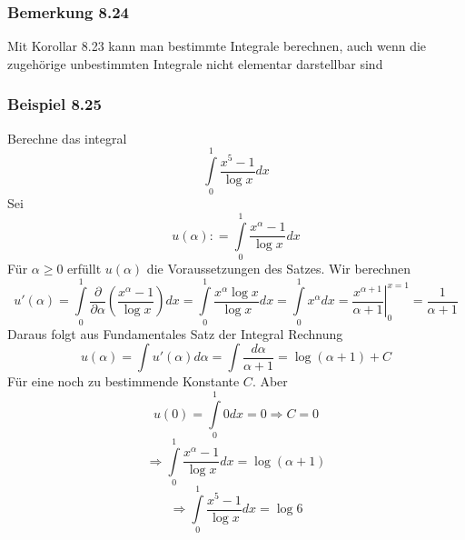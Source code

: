 \subsubsection*{Bemerkung 8.24}
Mit Korollar 8.23 kann man bestimmte Integrale berechnen, auch wenn die zugehörige unbestimmten Integrale nicht elementar darstellbar sind
\subsubsection*{Beispiel 8.25}
Berechne das integral \[\int\limits_0^1 {\frac{{{x^5} - 1}}{{\log x}}} dx\] Sei \[u\left( \alpha  \right): = \int\limits_0^1 {\frac{{{x^\alpha } - 1}}{{\log x}}dx} \] Für $\alpha \geq 0$ erfüllt $u\left(\alpha\right)$ die Voraussetzungen des Satzes. Wir berechnen \[u'\left( \alpha  \right) = \int\limits_0^1 {\frac{\partial }{{\partial \alpha }}\left( {\frac{{{x^\alpha } - 1}}{{\log x}}} \right)dx}  = \int\limits_0^1 {\frac{{{x^\alpha }\log x}}{{\log x}}dx = \int\limits_0^1 {{x^\alpha }dx}  = \left. {\frac{{{x^{\alpha  + 1}}}}{{\alpha  + 1}}} \right|_0^{x = 1} = } \frac{1}{{\alpha  + 1}}\] 
Daraus folgt aus Fundamentales Satz der Integral Rechnung \[u\left( \alpha  \right) = \int {u'\left( \alpha  \right)d\alpha  = \int {\frac{{d\alpha }}{{\alpha  + 1}} = \log \left( {\alpha  + 1} \right)} }  + C\]
Für eine noch zu bestimmende Konstante $C$. Aber
\[u\left( 0 \right) = \int\limits_0^1 {0dx = 0 \Rightarrow C = 0} \]
\[ \Rightarrow \int\limits_0^1 {\frac{{{x^\alpha } - 1}}{{\log x}}dx = \log \left( {\alpha  + 1} \right)} \]
\[ \Rightarrow \int\limits_0^1 {\frac{{{x^5} - 1}}{{\log x}}dx = \log 6} \]

